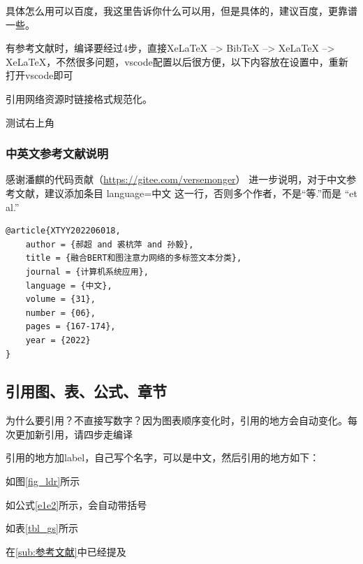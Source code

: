 \documentclass[AutoFakeBold]{LZUThesis}
\begin{document}
具体怎么用可以百度，我这里告诉你什么可以用，但是具体的，建议百度，更靠谱一些。


有参考文献时，编译要经过4步，直接XeLaTeX --> BibTeX --> XeLaTeX --> XeLaTeX，不然很多问题，vscode配置以后很方便，以下内容放在设置中，重新打开vscode即可

引用网络资源时链接格式规范化。

测试右上角

\subsubsection{中英文参考文献说明} %
感谢潘麒的代码贡献（\url{https://gitee.com/versemonger}）
进一步说明，对于中文参考文献，建议添加条目 language={中文} 这一行，否则多个作者，不是“等.”而是 “et al.”
\begin{lstlisting}[language = tex]
@article{XTYY202206018,
    author = {郝超 and 裘杭萍 and 孙毅},
    title = {融合BERT和图注意力网络的多标签文本分类},
    journal = {计算机系统应用},
    language = {中文},
    volume = {31},
    number = {06},
    pages = {167-174},
    year = {2022}
}
\end{lstlisting}




\subsection{引用图、表、公式、章节} %

为什么要引用？不直接写数字？因为图表顺序变化时，引用的地方会自动变化。每次更加新引用，请四步走编译

引用的地方加label，自己写个名字，可以是中文，然后引用的地方如下：

如图\ref{fig_ldr}所示

如公式\eqref{e1e2}所示，会自动带括号

如表\ref{tbl_gs}所示

在\ref{sub:参考文献}中已经提及

% 

\backmatter


\printbib
\end{document}
